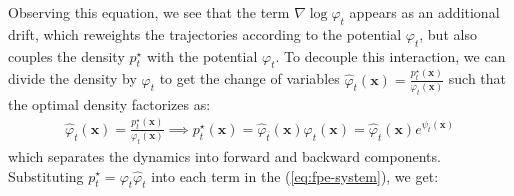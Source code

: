 \documentclass{article}
\begin{document}
Observing this equation, we see that the term $\nabla \log\varphi_t$ appears as an additional drift, which reweights the trajectories according to the potential $\varphi_t$, but also couples the density $p^\star_t$ with the potential $\varphi_t$. To decouple this interaction, we can divide the density by $\varphi_t$ to get the change of variables $\hat{\varphi}_t(\boldsymbol{x})=\frac{p^\star_t(\boldsymbol{x})}{\varphi_t(\boldsymbol{x})}$ such that the optimal density factorizes as:
\begin{align}
    \hat{\varphi}_t(\boldsymbol{x})=\frac{p^\star_t(\boldsymbol{x})}{\varphi_t(\boldsymbol{x})}\implies p^\star_t(\boldsymbol{x})=\hat{\varphi}_t(\boldsymbol{x})\varphi_t(\boldsymbol{x})=\hat{\varphi}_t(\boldsymbol{x})e^{\psi_t(\boldsymbol{x})}
\end{align}
which separates the dynamics into forward and backward components. Substituting $p^\star_t=\varphi_t\hat{\varphi}_t$ into each term in the (\ref{eq:fpe-system}), we get:
\end{document}

